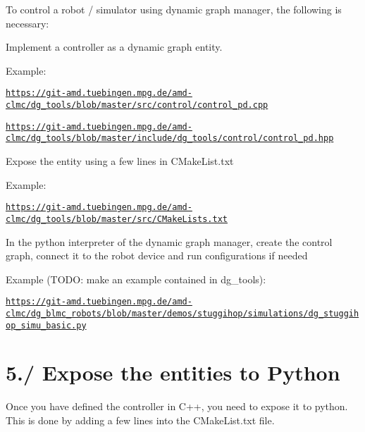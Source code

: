To control a robot / simulator using dynamic graph manager, the following is necessary\+:
\begin{DoxyItemize}
\item Implement a controller as a dynamic graph entity.
\item Example\+:
\begin{DoxyItemize}
\item \href{https://git-amd.tuebingen.mpg.de/amd-clmc/dg_tools/blob/master/src/control/control_pd.cpp}{\tt https\+://git-\/amd.\+tuebingen.\+mpg.\+de/amd-\/clmc/dg\+\_\+tools/blob/master/src/control/control\+\_\+pd.\+cpp}
\item \href{https://git-amd.tuebingen.mpg.de/amd-clmc/dg_tools/blob/master/include/dg_tools/control/control_pd.hpp}{\tt https\+://git-\/amd.\+tuebingen.\+mpg.\+de/amd-\/clmc/dg\+\_\+tools/blob/master/include/dg\+\_\+tools/control/control\+\_\+pd.\+hpp}
\end{DoxyItemize}
\item Expose the entity using a few lines in C\+Make\+List.\+txt
\item Example\+:
\begin{DoxyItemize}
\item \href{https://git-amd.tuebingen.mpg.de/amd-clmc/dg_tools/blob/master/src/CMakeLists.txt}{\tt https\+://git-\/amd.\+tuebingen.\+mpg.\+de/amd-\/clmc/dg\+\_\+tools/blob/master/src/\+C\+Make\+Lists.\+txt}
\end{DoxyItemize}
\item In the python interpreter of the dynamic graph manager, create the control graph, connect it to the robot device and run configurations if needed
\item Example (T\+O\+DO\+: make an example contained in dg\+\_\+tools)\+:
\begin{DoxyItemize}
\item \href{https://git-amd.tuebingen.mpg.de/amd-clmc/dg_blmc_robots/blob/master/demos/stuggihop/simulations/dg_stuggihop_simu_basic.py}{\tt https\+://git-\/amd.\+tuebingen.\+mpg.\+de/amd-\/clmc/dg\+\_\+blmc\+\_\+robots/blob/master/demos/stuggihop/simulations/dg\+\_\+stuggihop\+\_\+simu\+\_\+basic.\+py}
\end{DoxyItemize}
\end{DoxyItemize}\hypertarget{subpage_basic_control_graph_control_sec_expose_entity}{}\section{5./ Expose the entities to Python}\label{subpage_basic_control_graph_control_sec_expose_entity}
Once you have defined the controller in C++, you need to expose it to python. This is done by adding a few lines into the C\+Make\+List.\+txt file.

